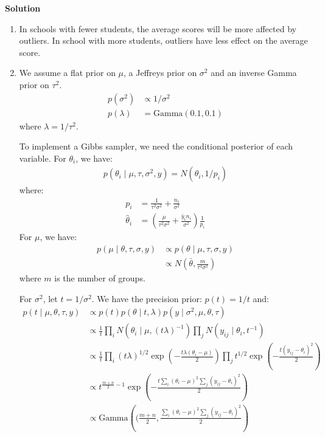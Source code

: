 \documentclass{article}
\begin{document}
\textbf{Solution}
\begin{enumerate}
\item In schools with fewer students, the average scores will be more affected by outliers. In school with more students, outliers have less effect on the average score.
\item 
We assume a flat prior on \(\mu\), a Jeffreys prior on \(\sigma^2\) and an inverse Gamma prior on \(\tau^2\).
\begin{align*}
p(\sigma^2) &\propto 1/\sigma^2\\
p(\lambda)  &= \mbox{Gamma}(0.1, 0.1)
\end{align*}
where \(\lambda = 1 / \tau^2\).

To implement a Gibbs sampler, we need the conditional posterior of each variable. For \(\theta_i\), we have:
\begin{align*}
p(\theta_i \mid \mu, \tau, \sigma^2, y) = N(\hat{\theta_i}, 1/p_i)
\end{align*}
where:
\begin{align*}
p_i &= \frac{1}{\tau^2 \sigma^2} + \frac{n_i}{\sigma^2}\\
\hat{\theta}_i &= \left(\frac{\mu}{\tau^2 \sigma^2} + \frac{\bar{y}_i n_i}{\sigma^2}\right) \frac{1}{p_i}
\end{align*}
For \(\mu\), we have:
\begin{align*}
p(\mu \mid \theta, \tau, \sigma, y) &\propto p(\theta \mid \mu, \tau, \sigma, y)\\
&\propto N(\bar{\theta}, \frac{m}{\tau^2\sigma^2})
\end{align*}
where \(m\) is the number of groups.

For \(\sigma^2\), let \(t = 1/\sigma^2\). We have the precision prior: \(p(t) = 1/t\) and: 
\begin{align*}
p(t \mid \mu, \theta, \tau, y) &\propto p(t) p(\theta \mid t, \lambda)p(y \mid \sigma^2, \mu, \theta, \tau)\\
&\propto \frac{1}{t} \prod_i N(\theta_i \mid \mu, (t\lambda)^{-1}) \prod_j N(y_{ij} \mid \theta_i, t^{-1})\\
&\propto \frac{1}{t} \prod_i (t\lambda)^{1/2} \exp \left(-\frac{t\lambda(\theta_i - \mu)}{2} \right) \prod_j t^{1/2} \exp \left( -\frac{t(y_{ij} - \theta_i)^2}{2} \right)\\
&\propto t^{\frac{m + n}{2} - 1} \exp \left( -\frac{t \sum_i(\theta_i -\mu)^2 \sum_j (y_{ij} - \theta_i)^2}{2} \right)\\
&\propto \mbox{Gamma}\left((\frac{m+n}{2}, \frac{\sum_i(\theta_i -\mu)^2 \sum_j (y_{ij} - \theta_i)^2}{2}\right)
\end{align*}


\end{enumerate}
\end{document}
